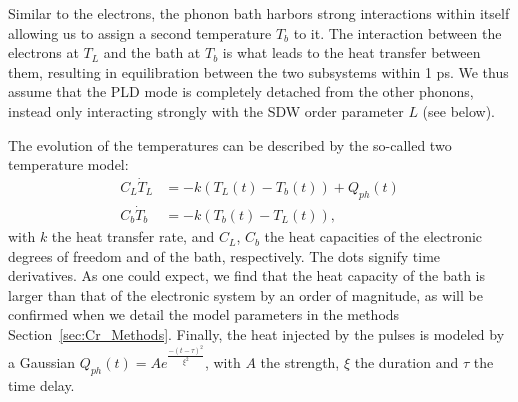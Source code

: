 Similar to the electrons, the phonon bath harbors strong interactions within itself allowing us to assign a second temperature $T_b$ to it.
The interaction between the electrons at $T_L$ and the bath at $T_b$ is what leads to the heat transfer between them, resulting in equilibration between the two subsystems within 1 ps.
We thus assume that the PLD mode is completely detached from the other phonons, instead only interacting strongly with the SDW order parameter $L$ (see below). 

The evolution of the temperatures can be described by the so-called two temperature model:
\begin{align}
	\label{eq:Cr_twotemp}
	C_L \dot{T}_L &= -k(T_L(t) - T_b(t)) + Q_{ph}(t) \\
	C_b \dot{T}_b &= -k(T_b(t) - T_L(t)),\nonumber
\end{align}
with $k$ the heat transfer rate, and $C_L$, $C_b$ the heat capacities of the electronic degrees of freedom and of the bath, respectively.
The dots signify time derivatives.
As one could expect, we find that the heat capacity of the bath is larger than that of the electronic system by an order of magnitude, as will be confirmed when we detail the model parameters in the methods Section~\ref{sec:Cr_Methods}.
Finally, the heat injected by the pulses is modeled by a Gaussian $Q_{ph}(t) = A e^{\frac{-(t - \tau)^2}{\xi^2}}$, with $A$ the strength, $\xi$ the duration and $\tau$ the time delay.

